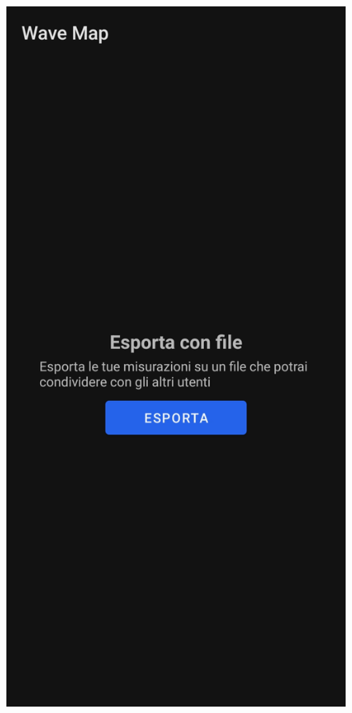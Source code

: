 \documentclass[11pt]{article}
\begin{document}
\begin{figure}[H]
    \centering
    \begin{minipage}[b]{0.25\textwidth}
      \includegraphics[width=\textwidth]{./img/overview/export1.jpg}

\end{minipage}
\end{figure}
\end{document}
